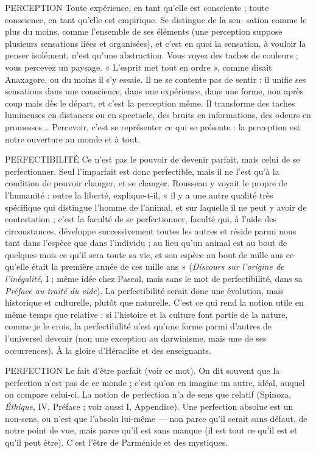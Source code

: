PERCEPTION Toute expérience, en tant qu’elle est consciente ; toute conscience,
en tant qu'elle est empirique. Se distingue de la sen-
sation comme le plus du moins, comme l’ensemble de ses éléments (une perception
suppose plusieurs sensations liées et organisées), et c’est en quoi la
sensation, à vouloir la penser isolément, n’est qu’une abstraction. Vous voyez
des taches de couleurs ; vous percevez un paysage. « L'esprit met tout en
ordre », comme disait Anaxagore, ou du moins il s’y essaie. Il ne se contente
pas de sentir : il unifie ses sensations dans une conscience, dans une expérience,
dans une forme, non après coup mais dès le départ, et c’est la perception
même. Il transforme des taches lumineuses en distances ou en spectacle,
des bruits en informations, des odeurs en promesses... Percevoir, c’est se
représenter ce qui se présente : la perception est notre ouverture au monde et
à tout.

PERFECTIBILITÉ Ce n’est pas le pouvoir de devenir parfait, mais celui de
se perfectionner. Seul l’imparfait est donc perfectible,
mais il ne l’est qu’à la condition de pouvoir changer, et se changer. Rousseau y
voyait le propre de l'humanité : outre la liberté, explique-t-il, « il y a une autre
qualité très spécifique qui distingue l’homme de l’animal, et sur laquelle il ne
peut y avoir de contestation ; c’est la faculté de se perfectionner, faculté qui, à
l’aide des circonstances, développe successivement toutes les autres et réside
parmi nous tant dans l’espèce que dans l'individu ; au lieu qu’un animal est au
bout de quelques mois ce qu’il sera toute sa vie, et son espèce au bout de mille
ans ce qu’elle était la première année de ces mille ans » ({\it Discours sur l'origine de
l'inégalité}, I ; même idée chez Pascal, mais sans le mot de perfectibilité, dans sa
{\it Préface au traité du vide}). La perfectibilité serait donc une évolution, mais historique
et culturelle, plutôt que naturelle. C’est ce qui rend la notion utile en
même temps que relative : si l’histoire et la culture font partie de la nature,
comme je le crois, la perfectibilité n’est qu’une forme parmi d’autres de l’universel
devenir (non une exception au darwinisme, mais une de ses occurrences).
À la gloire d'Héraclite et des enseignants.

PERFECTION Le fait d’être parfait (voir ce mot). On dit souvent que la perfection
n’est pas de ce monde ; c’est qu'on en imagine un
autre, idéal, auquel on compare celui-ci. La notion de perfection n’a de sens
que relatif (Spinoza, {\it Éthique}, IV, Préface ; voir aussi I, Appendice). Une perfection
absolue est un non-sens, ou n’est que l’absolu lui-même — non parce qu’il
serait sans défaut, de notre point de vue, mais parce qu’il est sans manque (il
est tout ce qu’il est et qu’il peut être). C’est l’être de Parménide et des mystiques.

